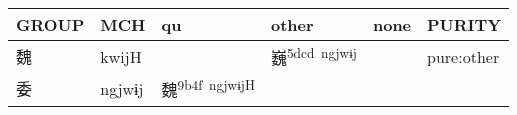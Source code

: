 \documentclass[14pt,a4paper]{scrartcl}
\begin{document}
\begin{longtable}[c]{@{}llllll@{}}
\toprule
\begin{minipage}[b]{0.14\columnwidth}\raggedright\strut
GROUP
\strut\end{minipage} &
\begin{minipage}[b]{0.14\columnwidth}\raggedright\strut
MCH
\strut\end{minipage} &
\begin{minipage}[b]{0.14\columnwidth}\raggedright\strut
qu
\strut\end{minipage} &
\begin{minipage}[b]{0.14\columnwidth}\raggedright\strut
other
\strut\end{minipage} &
\begin{minipage}[b]{0.14\columnwidth}\raggedright\strut
none
\strut\end{minipage} &
\begin{minipage}[b]{0.14\columnwidth}\raggedright\strut
PURITY
\strut\end{minipage}\tabularnewline
\midrule
\endhead
\begin{minipage}[t]{0.14\columnwidth}\raggedright\strut
魏
\strut\end{minipage} &
\begin{minipage}[t]{0.14\columnwidth}\raggedright\strut
kwijH
\strut\end{minipage} &
\begin{minipage}[t]{0.14\columnwidth}\raggedright\strut
\strut\end{minipage} &
\begin{minipage}[t]{0.14\columnwidth}\raggedright\strut
巍\textsuperscript{5dcd~ngjwɨj}
\strut\end{minipage} &
\begin{minipage}[t]{0.14\columnwidth}\raggedright\strut
\strut\end{minipage} &
\begin{minipage}[t]{0.14\columnwidth}\raggedright\strut
pure:other
\strut\end{minipage}\tabularnewline
\begin{minipage}[t]{0.14\columnwidth}\raggedright\strut
委
\strut\end{minipage} &
\begin{minipage}[t]{0.14\columnwidth}\raggedright\strut
ngjwɨj
\strut\end{minipage} &
\begin{minipage}[t]{0.14\columnwidth}\raggedright\strut
魏\textsuperscript{9b4f~ngjwɨjH}
\strut\end{minipage} &

\end{longtable}
\end{document}
